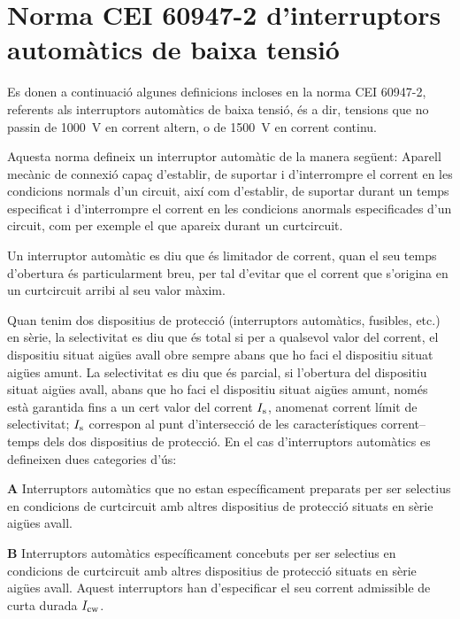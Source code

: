 \section{Norma CEI 60947-2  d'interruptors automàtics  de baixa tensió}


Es donen a continuació algunes definicions incloses en la norma CEI 60947-2, referents als interruptors automàtics de baixa tensió, és a dir, tensions que no passin de \SI{1000}{V} en corrent altern, o de \SI{1500}{V} en corrent continu.

Aquesta norma defineix un interruptor automàtic de la manera següent: Aparell mecànic de connexió capaç d'establir, de suportar i d'interrompre el corrent en les condicions normals d'un circuit, així com d'establir, de suportar durant un temps especificat i  d'interrompre el corrent en les condicions anormals especificades d'un circuit, com per exemple el que apareix durant un curtcircuit.

Un interruptor automàtic es diu que és limitador de corrent, quan el seu temps d'obertura és particularment breu, per tal d'evitar que el corrent que s'origina en un curtcircuit arribi al seu valor màxim.

Quan tenim dos  dispositius de protecció (interruptors automàtics, fusibles, etc.) en sèrie, la selectivitat es diu que és total si per a qualsevol valor del corrent, el dispositiu situat aigües avall obre sempre abans que ho faci el dispositiu situat aigües amunt. La selectivitat es diu que és parcial, si l'obertura del dispositiu situat aigües avall, abans que ho faci el dispositiu situat aigües amunt, només està garantida fins a un cert valor del corrent $I_\mathrm{s}$, anomenat corrent límit de selectivitat; $I_\mathrm{s}$ correspon al punt d'intersecció de les característiques corrent--temps dels dos dispositius de protecció. En el cas d'interruptors automàtics es defineixen dues categories d'ús:
 \begin{list}{}
   {\setlength{\labelwidth}{10mm} \setlength{\leftmargin}{10mm} \setlength{\labelsep}{2mm}}
   \item[\textbf{A}] Interruptors automàtics que no estan específicament preparats per ser selectius en condicions de curtcircuit amb altres dispositius de protecció situats en sèrie  aigües avall.
   \item[\textbf{B}] Interruptors automàtics específicament concebuts per ser selectius en condicions de curtcircuit amb altres dispositius de protecció situats en sèrie  aigües avall. Aquest interruptors han d'especificar el seu corrent admissible de curta durada $I_\mathrm{cw}$.
\end{list}

